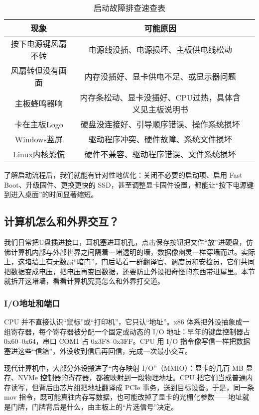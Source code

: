 \begin{table}[htbp]
  \centering
  \caption{启动故障排查速查表}
  \begin{tabular}{ccc}
    \toprule
    现象 & 可能原因 \\
    \midrule
    按下电源键风扇不转 & 电源线没插、电源损坏、主板供电线松动 \\
    风扇转但没有画面 & 内存没插好、显卡供电不足、或显示器问题 \\
    主板蜂鸣器响 & 内存条松动、显卡没插好、CPU过热，具体含义见主板说明书 \\
    卡在主板Logo & 硬盘没连接好、引导顺序错误、操作系统损坏 \\
    Windows蓝屏 & 驱动程序冲突、硬件故障、系统文件损坏 \\
    Linux内核恐慌 & 硬件不兼容、驱动程序错误、文件系统损坏 \\
    \bottomrule
  \end{tabular}
\end{table}

了解启动流程后，我们就能有针对性地优化：关闭不必要的启动项、启用 Fast Boot、升级固件、更换更快的 SSD，甚至调整显卡固件设置，都能让“按下电源键到进入桌面”的时间显著缩短。

\subsection{计算机怎么和外界交互？}

我们日常把U盘插进接口，耳机塞进耳机孔，点击保存按钮把文件“放”进硬盘，仿佛计算机内部与外部世界之间隔着一堵透明的墙，数据像幽灵一样穿墙而过。实际上，这堵墙上有无数扇“暗门”，门后站着一群翻译官、调度员和安检员，它们共同把数据变成电压，把电压再变回数据，还要防止外设把奇怪的东西带进屋里。本节就拆开这堵墙，看看计算机究竟怎么和外界打交道。

\subsubsection{I/O地址和端口}

CPU 并不直接认识“鼠标”或“打印机”，它只认“地址”。x86 体系把外设抽象成一组寄存器，每个寄存器被分配一个固定或动态的 I/O 地址：早年的键盘控制器占 0x60–0x64，串口 COM1 占 0x3F8–0x3FF。CPU 用 I/O 指令像写信一样把数据塞进这些“信箱”，外设收到信后再回信，完成一次最小交互。

现代计算机中，大部分外设搬进了“内存映射 I/O”（MMIO）：显卡的几百 MB 显存、NVMe 控制器的寄存器，都被映射到一段物理地址。CPU 把它们当成普通内存读写，但背后由芯片组把地址翻译成 PCIe 事务，送到目标设备。于是，同一条 mov 指令，既可能真往内存写数据，也可能改掉了显卡的光栅化参数——地址就是门牌，门牌背后是什么，由主板上的“片选信号”决定。

